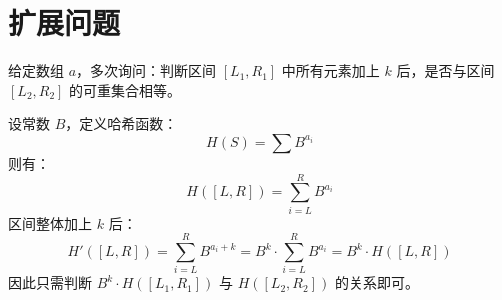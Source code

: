 \documentclass[11pt,a4paper,twocolumn]{ctexart}  %
\begin{document}
\section*{扩展问题}
给定数组 $a$，多次询问：判断区间 $[L_1,R_1]$ 中所有元素加上 $k$ 后，是否与区间 $[L_2,R_2]$ 的可重集合相等。

设常数 $B$，定义哈希函数：
\[
H(S)=\sum B^{a_i}
\]
则有：
\[
H([L,R])=\sum_{i=L}^{R} B^{a_i}
\]
区间整体加上 $k$ 后：
\[
H'([L,R])=\sum_{i=L}^{R} B^{a_i+k}=B^k\cdot\sum_{i=L}^{R} B^{a_i}=B^k\cdot H([L,R])
\]
因此只需判断 $B^k\cdot H([L_1,R_1])$ 与 $H([L_2,R_2])$ 的关系即可。
\end{document}
